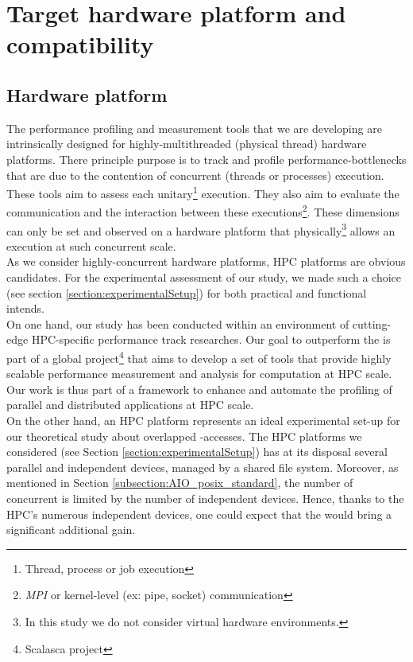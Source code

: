 \section{Target hardware platform and compatibility}
	\subsection{Hardware platform}
		The performance profiling and measurement tools that we are developing are intrinsically designed for highly-multithreaded (physical thread) hardware platforms.   There principle purpose is to track and profile performance-bottlenecks that are due to the contention of concurrent (threads or processes) execution.   These tools aim to assess each unitary\footnote{Thread, process or job execution} execution.   They also aim to evaluate the communication and the interaction between these executions\footnote{\emph{MPI} or kernel-level (ex: pipe, socket) communication}.   These dimensions can only be set and observed on a hardware platform that physically\footnote{In this study we do not consider virtual hardware environments.} allows an execution at such concurrent scale.\\

		As we consider highly-concurrent hardware platforms, HPC platforms are obvious candidates.   For the experimental assessment of our study, we made such a choice (see section \ref{section:experimentalSetup})  for both practical and functional intends.\\

		On one hand, our study has been conducted within an environment of cutting-edge HPC-specific performance track researches.   Our goal to outperform the \toolTargetSoftware \cite{saviankou2015cube} is part of a global project\footnote{Scalasca project\cite{zhukov2013assessing}} that aims to develop a set of tools that provide highly scalable performance measurement and analysis for computation at HPC scale.   Our work is thus part of a framework to enhance and automate the profiling of parallel and distributed applications at HPC scale.\\

		On the other hand, an HPC platform represents an ideal experimental set-up for our theoretical study about overlapped \notationIO-accesses.   The HPC platforms we considered (see Section \ref{section:experimentalSetup}) has at its disposal several parallel and independent \notationIO\space devices, managed by a shared file system.   Moreover, as mentioned in Section \ref{subsection:AIO_posix_standard}, the number of concurrent \notationaioWriteThreads\space is limited by the number of independent \notationIO\space devices.   Hence, thanks to the HPC's numerous independent \notationIO\space devices, one could expect that the \notationaio would bring a significant additional gain.\\

